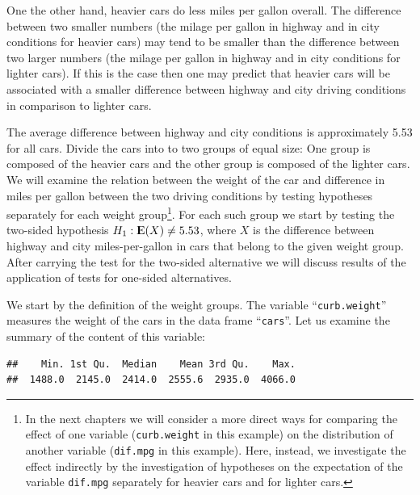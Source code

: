 \documentclass[]{krantz}
\makeatletter
\newenvironment{Shaded}{\begin{snugshade}}{\end{snugshade}}
\newcommand{\KeywordTok}[1]{\textcolor[rgb]{0.13,0.29,0.53}{\textbf{#1}}}
\newcommand{\NormalTok}[1]{#1}
\newcommand{\OperatorTok}[1]{\textcolor[rgb]{0.81,0.36,0.00}{\textbf{#1}}}
\newcommand{\Expec}{{\rm I\kern-.3em E}}
\newenvironment{kframe}{%
\medskip{}
\setlength{\fboxsep}{.8em}
 \def\at@end@of@kframe{}%
 \ifinner\ifhmode%
  \def\at@end@of@kframe{\end{minipage}}%
  \begin{minipage}{\columnwidth}%
 \fi\fi%
 \def\FrameCommand##1{\hskip\@totalleftmargin \hskip-\fboxsep
 \colorbox{shadecolor}{##1}\hskip-\fboxsep
     \hskip-\linewidth \hskip-\@totalleftmargin \hskip\columnwidth}%
 \MakeFramed {\advance\hsize-\width
   \@totalleftmargin\z@ \linewidth\hsize
   \@setminipage}}%
 {\par\unskip\endMakeFramed%
 \at@end@of@kframe}
\renewenvironment{Shaded}{\begin{kframe}}{\end{kframe}}
\theoremstyle{definition}
\theoremstyle{definition}
\theoremstyle{definition}
\theoremstyle{remark}
\makeatother
\begin{document}
One the other hand, heavier cars do less miles per gallon overall. The
difference between two smaller numbers (the milage per gallon in highway
and in city conditions for heavier cars) may tend to be smaller than the
difference between two larger numbers (the milage per gallon in highway
and in city conditions for lighter cars). If this is the case then one
may predict that heavier cars will be associated with a smaller
difference between highway and city driving conditions in comparison to
lighter cars.

The average difference between highway and city conditions is
approximately 5.53 for all cars. Divide the cars into to two groups of
equal size: One group is composed of the heavier cars and the other
group is composed of the lighter cars. We will examine the relation
between the weight of the car and difference in miles per gallon between
the two driving conditions by testing hypotheses separately for each
weight group\footnote{In the next chapters we will consider a more direct ways for
  comparing the effect of one variable (\texttt{curb.weight} in this example)
  on the distribution of another variable (\texttt{dif.mpg} in this example).
  Here, instead, we investigate the effect indirectly by the
  investigation of hypotheses on the expectation of the variable
  \texttt{dif.mpg} separately for heavier cars and for lighter cars.}. For each such group we start by testing the two-sided
hypothesis \(H_1:\Expec(X) \not = 5.53\), where \(X\) is the difference
between highway and city miles-per-gallon in cars that belong to the
given weight group. After carrying the test for the two-sided
alternative we will discuss results of the application of tests for
one-sided alternatives.

We start by the definition of the weight groups. The variable
``\texttt{curb.weight}'' measures the weight of the cars in the data frame
``\texttt{cars}''. Let us examine the summary of the content of this variable:

\begin{Shaded}
\end{Shaded}

\begin{verbatim}
##    Min. 1st Qu.  Median    Mean 3rd Qu.    Max. 
##  1488.0  2145.0  2414.0  2555.6  2935.0  4066.0
\end{verbatim}
\end{document}
